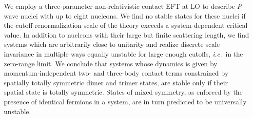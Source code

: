 \documentclass[onecolumn,preprint,superscriptaddress,nofootinbib]{revtex4-1}
\newcommand{\ie}{\textit{i.e.}~}
\begin{document}
We employ a three-parameter non-relativistic contact EFT at LO to describe $P$-wave nuclei with up to eight nucleons.
We find no stable states for these nuclei if the cutoff-renormalization scale of the theory exceeds a system-dependent critical value.
In addition to nucleons with their large but finite scattering length, we find systems which are arbitrarily close to unitarity and realize
discrete scale invariance in multiple ways equally unstable for large enough cutoffs, \ie in the zero-range limit.
We conclude that systems whose dynamics is given by momentum-independent two- and three-body contact terms
constrained by spatially totally symmetric dimer and trimer states, are stable only if their spatial state is totally symmetric.
States of mixed symmetry, as enforced by the presence of identical fermions in a system, are in turn predicted to be universally unstable. 
\end{document}

